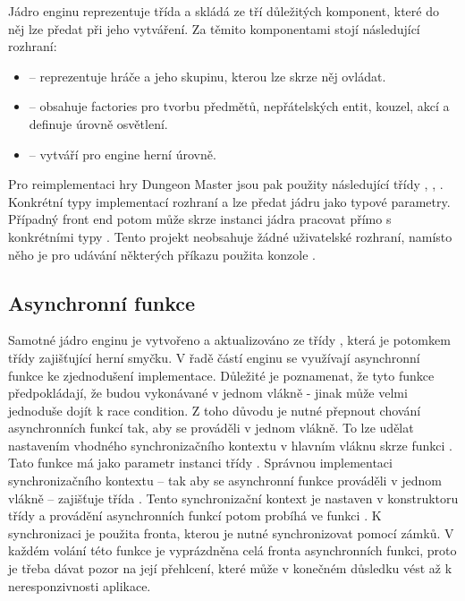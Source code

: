 Jádro enginu reprezentuje třída  a skládá ze tří důležitých komponent, které do něj lze předat při jeho vytváření. 
Za těmito komponentami stojí následující rozhraní:

\begin{itemize}
\item {} -- reprezentuje hráče a jeho skupinu, kterou lze skrze něj ovládat.
\item {} -- obsahuje factories pro tvorbu předmětů, nepřátelských entit, kouzel, akcí a definuje úrovně osvětlení.
\item {} -- vytváří pro engine herní úrovně.
\end{itemize}

Pro reimplementaci hry Dungeon Master jsou pak použity následující třídy ,
, . Konkrétní typy implementací rozhraní
 a  lze předat jádru jako typové parametry.
Případný front end potom může skrze instanci jádra pracovat přímo s konkrétními typy . Tento projekt
neobsahuje žádné uživatelské rozhraní, namísto něho je pro udávání některých příkazu použita konzole .


\subsection{Asynchronní funkce}\label{async-engine}

Samotné jádro enginu je vytvořeno a aktualizováno ze třídy , která je potomkem třídy  zajišťující herní smyčku.
V řadě částí enginu se využívají asynchronní funkce ke zjednodušení implementace. Důležité je 
poznamenat, že tyto funkce předpokládají, že budou vykonávané v jednom vlákně - jinak může velmi jednoduše dojít k race condition.
Z toho důvodu je nutné přepnout chování asynchronních funkcí tak, aby se prováděli v jednom vlákně. To lze udělat nastavením 
vhodného synchronizačního kontextu v hlavním vláknu skrze funkci . 
Tato funkce má jako parametr instanci třídy . Správnou implementaci synchronizačního kontextu 
-- tak aby se asynchronní funkce prováděli v jednom vlákně -- zajišťuje třída . Tento synchronizační
kontext je nastaven v konstruktoru třídy  a provádění asynchronních funkcí potom probíhá ve funkci .
K synchronizaci je použita fronta, kterou je nutné synchronizovat pomocí zámků.
V každém volání této funkce je vyprázdněna celá fronta asynchronních funkci, proto je třeba dávat pozor na její přehlcení,
které může v konečném důsledku vést až k neresponzivnosti aplikace.


